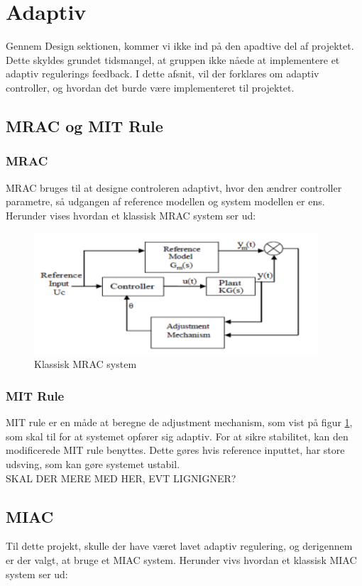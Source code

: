 \section{Adaptiv}

Gennem Design sektionen, kommer vi ikke ind på den apadtive del af projektet. Dette skyldes grundet tidsmangel, at gruppen ikke nåede at implementere et adaptiv regulerings feedback. I dette afsnit, vil der forklares om adaptiv controller, og hvordan det burde være implementeret til projektet. 

\subsection{MRAC og MIT Rule}
\subsubsection{MRAC}
MRAC bruges til at designe controleren adaptivt, hvor den ændrer controller parametre, så udgangen af reference modellen og system modellen er ens. 
Herunder vises hvordan et klassisk MRAC system ser ud:


\begin{figure}[H]
	\centering
	\includegraphics[width = 300pt]{figur/MRAC}
	\caption{Klassisk MRAC system}
	\label{fig:MRAC}
\end{figure}

\subsubsection{MIT Rule}
MIT rule er en måde at beregne de adjustment mechanism, som vist på figur \ref{fig:MRAC}, som skal til for at systemet opfører sig adaptiv. For at sikre stabilitet, kan den modificerede MIT rule benyttes. Dette gøres hvis reference inputtet, har store udsving, som kan gøre systemet ustabil. \\

SKAL DER MERE MED HER, EVT LIGNIGNER?

\subsection{MIAC}
Til dette projekt, skulle der have været lavet adaptiv regulering, og derigennem er der valgt, at bruge et MIAC system. Herunder vivs hvordan et klassisk MIAC system ser ud:

